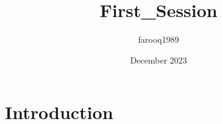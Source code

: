 \documentclass{article}
\title{First_Session}
\author{farooq1989 }
\date{December 2023}
\begin{document}

\section{Introduction}
\end{document}
